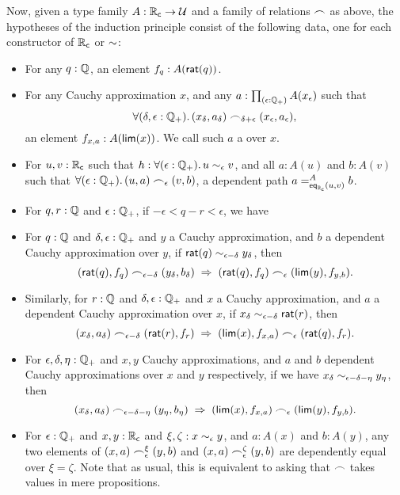 %
Now, given a type family $A:\RC\to\type$ and a family of relations $\bsim$ as above, the hypotheses of the induction principle consist of the following data, one for each constructor of $\RC$ or $\closesym$:
\begin{itemize}
\item For any $q : \Q$, an element $f_q:A(\rcrat(q))$.
\item For any Cauchy approximation $x$, and any $a:\prd{\epsilon:\Qp} A(x_\epsilon)$ such that
  \begin{equation}
    \fall{\delta, \epsilon : \Qp}
    (x_\delta,a_\delta) \bsim_{\delta+\epsilon} (x_\epsilon,a_\epsilon),
    \label{eq:depCauchyappx}
  \end{equation}
  an element $f_{x,a}:A(\rclim(x))$.
  We call such $a$ a 
  over $x$.
\item For $u, v : \RC$ such that $h:\fall{\epsilon : \Qp} u \close\epsilon v$, and all $a:A(u)$ and $b:A(v)$ such that
  $\fall{\epsilon:\Qp} (u,a) \bsim_\epsilon (v,b)$,
  a dependent path $\dpath{A}{\rceq(u,v)}{a}{b}$.
\item For $q,r:\Q$ and $\epsilon:\Qp$, if $-\epsilon < q - r < \epsilon$, we have
\item For $q:\Q$ and $\delta,\epsilon:\Qp$ and $y$ a Cauchy approximation, and $b$ a dependent Cauchy approximation over $y$, if $\rcrat(q) \close{\epsilon - \delta} y_\delta$, then
  \[(\rcrat(q),f_q) \bsim_{\epsilon-\delta} (y_\delta,b_\delta)
  \;\Rightarrow\;
  (\rcrat(q),f_q) \bsim_\epsilon (\rclim(y),f_{y,b}).\]
\item Similarly, for $r:\Q$ and $\delta,\epsilon:\Qp$ and $x$ a Cauchy approximation, and $a$ a dependent Cauchy approximation over $x$, if $x_\delta \close{\epsilon - \delta} \rcrat(r)$, then
  \[(x_\delta,a_\delta) \bsim_{\epsilon-\delta} (\rcrat(r),f_r)
  \;\Rightarrow\;
  (\rclim(x),f_{x,a}) \bsim_\epsilon (\rcrat(q),f_r).
  \]
\item For $\epsilon,\delta,\eta:\Qp$ and $x,y$ Cauchy approximations, and $a$ and $b$ dependent Cauchy approximations over $x$ and $y$ respectively, if we have $x_\delta \close{\epsilon - \delta - \eta} y_\eta$, then
  \[ (x_\delta,a_\delta) \bsim_{\epsilon - \delta - \eta} (y_\eta,b_\eta)
  \;\Rightarrow\;
  (\rclim(x),f_{x,a}) \bsim_\epsilon (\rclim(y),f_{y,b}).\]
\item For $\epsilon:\Qp$ and $x,y:\RC$ and $\xi,\zeta:x\close{\epsilon} y$, and $a:A(x)$ and $b:A(y)$, any two elements of $(x,a) \bsim_\epsilon^\xi (y,b)$ and $(x,a) \bsim_\epsilon^\zeta (y,b)$ are dependently equal over $\xi=\zeta$.
  Note that as usual, this is equivalent to asking that $\bsim$ takes values in mere propositions.
\end{itemize}
